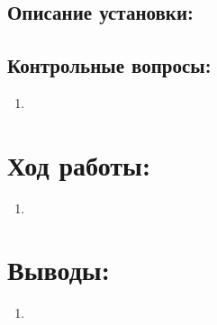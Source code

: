 \documentclass[a4paper,12pt]{article}
\begin{document}
\subsection{Описание установки:}
\paragraph{}

\subsection{Контрольные вопросы:}
\begin{enumerate}
\itemsep0em
\item 
\end{enumerate}
\section{Ход работы:}
\begin{enumerate}
\renewcommand{\labelenumii}{\arabic{enumii})}
\itemsep0em
\item
\end{enumerate}
\section{Выводы:}
\begin{enumerate}
\item
\end{enumerate}
\end{document}
